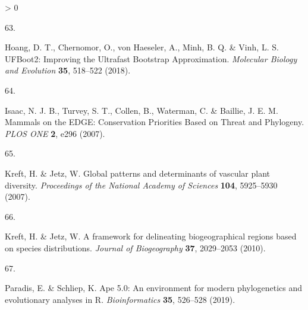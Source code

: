 \documentclass[11pt]{article}
\newlength{\cslhangindent}
\newlength{\csllabelwidth}
\newenvironment{CSLReferences}[3] %
 {%
  \setlength{\parindent}{0pt}
  \ifodd #1 \everypar{\setlength{\hangindent}{\cslhangindent}}\ignorespaces\fi
  \ifnum #2 > 0
  \setlength{\parskip}{#2\baselineskip}
  \fi
 }%
 {}
\newcommand{\CSLLeftMargin}[1]{\parbox[t]{\maxof{\widthof{#1}}{\csllabelwidth}}{#1}}
\newcommand{\CSLRightInline}[1]{\parbox[t]{\linewidth}{#1}}
\begin{document}
\begin{CSLReferences}{0}{0}
\leavevmode\hypertarget{ref-Hoang2018UfbImp}{}%
\CSLLeftMargin{63. }
\CSLRightInline{Hoang, D. T., Chernomor, O., von Haeseler, A., Minh, B.
Q. \& Vinh, L. S. UFBoot2: Improving the Ultrafast Bootstrap
Approximation. \emph{Molecular Biology and Evolution} \textbf{35},
518--522 (2018).}

\leavevmode\hypertarget{ref-Isaac2007MamEdg}{}%
\CSLLeftMargin{64. }
\CSLRightInline{Isaac, N. J. B., Turvey, S. T., Collen, B., Waterman, C.
\& Baillie, J. E. M. Mammals on the EDGE: Conservation Priorities Based
on Threat and Phylogeny. \emph{PLOS ONE} \textbf{2}, e296 (2007).}

\leavevmode\hypertarget{ref-Kreft2007GloPat}{}%
\CSLLeftMargin{65. }
\CSLRightInline{Kreft, H. \& Jetz, W. Global patterns and determinants
of vascular plant diversity. \emph{Proceedings of the National Academy
of Sciences} \textbf{104}, 5925--5930 (2007).}

\leavevmode\hypertarget{ref-Kreft2010FraDel}{}%
\CSLLeftMargin{66. }
\CSLRightInline{Kreft, H. \& Jetz, W. A framework for delineating
biogeographical regions based on species distributions. \emph{Journal of
Biogeography} \textbf{37}, 2029--2053 (2010).}

\leavevmode\hypertarget{ref-Paradis2019ApeEnv}{}%
\CSLLeftMargin{67. }
\CSLRightInline{Paradis, E. \& Schliep, K. Ape 5.0: An environment for
modern phylogenetics and evolutionary analyses in R.
\emph{Bioinformatics} \textbf{35}, 526--528 (2019).}

\end{CSLReferences}
\end{document}
